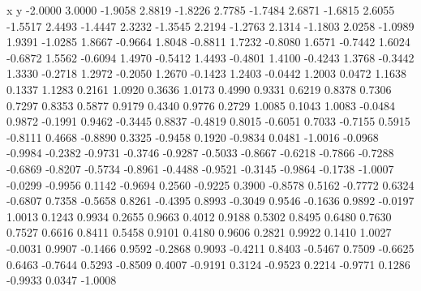x y
-2.0000    3.0000
   -1.9058    2.8819
   -1.8226    2.7785
   -1.7484    2.6871
   -1.6815    2.6055
   -1.5517    2.4493
   -1.4447    2.3232
   -1.3545    2.2194
   -1.2763    2.1314
   -1.1803    2.0258
   -1.0989    1.9391
   -1.0285    1.8667
   -0.9664    1.8048
   -0.8811    1.7232
   -0.8080    1.6571
   -0.7442    1.6024
   -0.6872    1.5562
   -0.6094    1.4970
   -0.5412    1.4493
   -0.4801    1.4100
   -0.4243    1.3768
   -0.3442    1.3330
   -0.2718    1.2972
   -0.2050    1.2670
   -0.1423    1.2403
   -0.0442    1.2003
    0.0472    1.1638
    0.1337    1.1283
    0.2161    1.0920
    0.3636    1.0173
    0.4990    0.9331
    0.6219    0.8378
    0.7306    0.7297
    0.8353    0.5877
    0.9179    0.4340
    0.9776    0.2729
    1.0085    0.1043
    1.0083   -0.0484
    0.9872   -0.1991
    0.9462   -0.3445
    0.8837   -0.4819
    0.8015   -0.6051
    0.7033   -0.7155
    0.5915   -0.8111
    0.4668   -0.8890
    0.3325   -0.9458
    0.1920   -0.9834
    0.0481   -1.0016
   -0.0968   -0.9984
   -0.2382   -0.9731
   -0.3746   -0.9287
   -0.5033   -0.8667
   -0.6218   -0.7866
   -0.7288   -0.6869
   -0.8207   -0.5734
   -0.8961   -0.4488
   -0.9521   -0.3145
   -0.9864   -0.1738
   -1.0007   -0.0299
   -0.9956    0.1142
   -0.9694    0.2560
   -0.9225    0.3900
   -0.8578    0.5162
   -0.7772    0.6324
   -0.6807    0.7358
   -0.5658    0.8261
   -0.4395    0.8993
   -0.3049    0.9546
   -0.1636    0.9892
   -0.0197    1.0013
    0.1243    0.9934
    0.2655    0.9663
    0.4012    0.9188
    0.5302    0.8495
    0.6480    0.7630
    0.7527    0.6616
    0.8411    0.5458
    0.9101    0.4180
    0.9606    0.2821
    0.9922    0.1410
    1.0027   -0.0031
    0.9907   -0.1466
    0.9592   -0.2868
    0.9093   -0.4211
    0.8403   -0.5467
    0.7509   -0.6625
    0.6463   -0.7644
    0.5293   -0.8509
    0.4007   -0.9191
    0.3124   -0.9523
    0.2214   -0.9771
    0.1286   -0.9933
    0.0347   -1.0008
